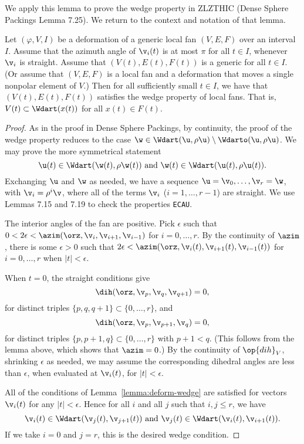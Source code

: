 We apply this lemma to prove the wedge property in ZLZTHIC (Dense Sphere Packings Lemma 7.25).
We return to the context and notation of that lemma.

\begin{lemma}  
Let $(\varphi,V,I)$ be a deformation of a generic local fan $(V,E,F)$ over an
interval $I$.  Assume that the azimuth angle of $\v_i(t)$ is at most $\pi$ for all  $t\in I$,
whenever $\v_i$ is straight.  Assume that $(V(t),E(t),F(t))$ is a generic for all $t\in I$.  (Or assume
that $(V,E,F)$ is a local fan and a deformation that moves a single nonpolar element of $V$.)
Then for all sufficiently small $t\in I$,  we have that $(V(t),E(t),F(t))$ satisfies the wedge property
of local fans.  That is, $V(t)\subset \Wdart(x(t))$ for all $x(t)\in F(t)$.
\end{lemma}

\begin{proof}
As in the proof in Dense Sphere Packings,  by continuity,
the proof of the wedge property reduces to the case $\w\in \Wdart(\u,\rho\u)\setminus \Wdarto(\u,\rho\u)$.
We may prove the more symmetrical statement
\[
\u(t)\in \Wdart(\w(t),\rho\w(t)) \text{ and } \w(t) \in \Wdart(\u(t),\rho\u(t)).
\]
Exchanging $\u$ and $\w$ as needed, 
we have a sequence $\u=\v_0,\ldots,\v_r =\w$, with $\v_i =\rho^i\v$,
where all of the terms $\v_i$ ($i=1,\ldots,r-1$) are straight.  We use Lemmas 7.15 and 7.19
to check the properties {\tt ECAU}.

The interior angles of the fan are positive.
Pick $\epsilon$ such that  $0 < 2\epsilon < \azim(\orz,\v_i,\v_{i+1},\v_{i-1})$ for $i=0,\ldots,r$.
By the continuity of $\azim$, there is some $\epsilon > 0$ such that
$2\epsilon < \azim(\orz,\v_i(t),\v_{i+1}(t),\v_{i-1}(t))$ for $i=0,\ldots,r$ when $|t|<\epsilon$.

When $t=0$, the straight conditions give
\[
\dih(\orz,\v_p,\v_q,\v_{q+1}) = 0,
\]
for distinct triples $\{p,q,q+1\} \subset \{0,\ldots,r\}$,
and
\[
\dih(\orz,\v_p,\v_{p+1},\v_q)=0,
\]
for distinct triples $\{p,p+1,q\}\subset \{0,\ldots,r\}$ with $p+1 < q$.  (This follows from
the lemma above, which shows that $\azim  = 0$.)
By the continuity of $\op{dih}_V$, 
shrinking $\epsilon$ as needed, we may assume the corresponding
dihedral angles are less than $\epsilon$, when evaluated at $\v_i(t)$, for $|t|<\epsilon$.

All of the conditions of Lemma~\ref{lemma:deform-wedge} are satisfied for
vectors $\v_i(t)$ for any $|t|<\epsilon$.  Hence for all $i$ and all $j$ such that $i,j\le r$, we have
\[
\v_i(t) \in \Wdart(\v_{j}(t),\v_{j+1}(t)) \text{ and } \v_j(t) \in \Wdart(\v_{i}(t),\v_{i+1}(t)).
\]
If we take $i=0$ and $j=r$, this is the desired wedge condition.
\end{proof}






